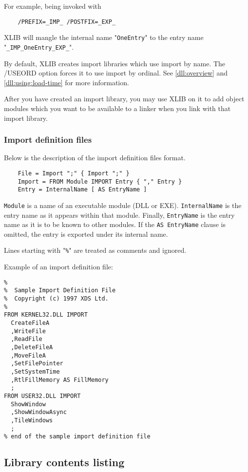 For example, being invoked with

\verb'    /PREFIX=_IMP_ /POSTFIX=_EXP_'

XLIB will mangle the internal name "\verb'OneEntry'" to
the entry name "\verb'_IMP_OneEntry_EXP_'".

By default, XLIB creates import libraries which use import by name.
The /USEORD option forces it to use import by ordinal.
See \ref{dll:overview} and \ref{dll:using:load-time} for more
information.

After you have created an import library, you may use XLIB on it to
add object modules which you want to be available to a linker when you
link with that import library.

\subsubsection{Import definition files}
\label{xlib:modes:import:IDF}

Below is the description of the import definition files format.

\begin{verbatim}
    File = Import ";" { Import ";" }
    Import = FROM Module IMPORT Entry { "," Entry }
    Entry = InternalName [ AS EntryName ]
\end{verbatim}

\verb'Module' is a name of an executable module (DLL or EXE).
\verb'InternalName' is the entry name as it appears within that module.
Finally, \verb'EntryName' is the entry name as it is to be known to
other modules. If the \verb'AS EntryName' clause is omitted, the entry is
exported under its internal name.

Lines starting with "\verb'%'" are treated as comments and ignored.

Example of an import definition file:

\begin{verbatim}
%
%  Sample Import Definition File
%  Copyright (c) 1997 XDS Ltd.
%
FROM KERNEL32.DLL IMPORT
  CreateFileA
  ,WriteFile
  ,ReadFile
  ,DeleteFileA
  ,MoveFileA
  ,SetFilePointer
  ,SetSystemTime
  ,RtlFillMemory AS FillMemory
  ;
FROM USER32.DLL IMPORT
  ShowWindow
  ,ShowWindowAsync
  ,TileWindows
  ;
% end of the sample import definition file
\end{verbatim}

\subsection{Library contents listing}
\label{xlib:modes:list}

